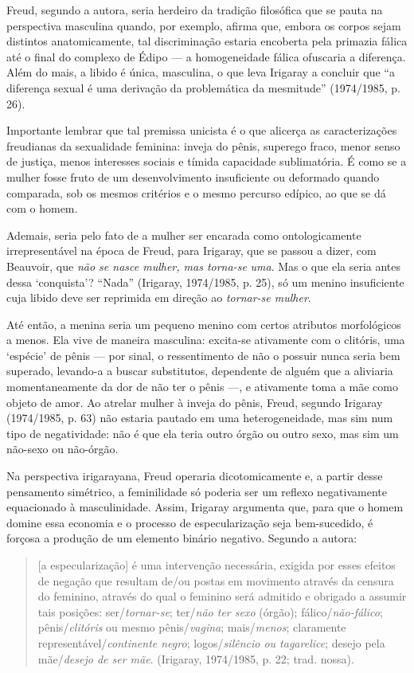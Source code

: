 Freud, segundo a autora, seria herdeiro da tradição filosófica que se
pauta na perspectiva masculina quando, por exemplo, afirma que, embora
os corpos sejam distintos anatomicamente, tal discriminação estaria
encoberta pela primazia fálica até o final do complexo de Édipo --- a
homogeneidade fálica ofuscaria a diferença. Além do mais, a libido é
única, masculina, o que leva Irigaray a concluir que ``a diferença
sexual é uma derivação da problemática da mesmitude'' (1974/1985, p.
26).

Importante lembrar que tal premissa unicista é o que alicerça as
caracterizações freudianas da sexualidade feminina: inveja do pênis,
superego fraco, menor senso de justiça, menos interesses sociais e
tímida capacidade sublimatória. É como se a mulher fosse fruto de um
desenvolvimento insuficiente ou deformado quando comparada, sob os
mesmos critérios e o mesmo percurso edípico, ao que se dá com o homem.

Ademais, seria pelo fato de a mulher ser encarada como ontologicamente
irrepresentável na época de Freud, para Irigaray, que se passou a dizer,
com Beauvoir, que \emph{não se nasce mulher, mas torna-se} \emph{uma}.
Mas o que ela seria antes dessa `conquista'? ``Nada'' (Irigaray,
1974/1985, p. 25), só um menino insuficiente cuja libido deve ser
reprimida em direção ao \emph{tornar-se mulher}.

Até então, a menina seria um pequeno menino com certos atributos
morfológicos a menos. Ela vive de maneira masculina: excita-se
ativamente com o clitóris, uma `espécie' de pênis --- por sinal, o
ressentimento de não o possuir nunca seria bem superado, levando-a a
buscar substitutos, dependente de alguém que a aliviaria momentaneamente
da dor de não ter o pênis ---, e ativamente toma a mãe como objeto de
amor. Ao atrelar mulher à inveja do pênis, Freud, segundo Irigaray
(1974/1985, p. 63) não estaria pautado em uma heterogeneidade, mas sim
num tipo de negatividade: não é que ela teria outro órgão ou outro sexo,
mas sim um não-sexo ou não-órgão.

Na perspectiva irigarayana, Freud operaria dicotomicamente e, a partir
desse pensamento simétrico, a feminilidade só poderia ser um reflexo
negativamente equacionado à masculinidade. Assim, Irigaray argumenta
que, para que o homem domine essa economia e o processo de
especularização seja bem-sucedido, é forçosa a produção de um elemento
binário negativo. Segundo a autora:

\begin{quote}
{[}a especularização{]} é uma intervenção necessária, exigida por esses
efeitos de negação que resultam de/ou postas em movimento através da
censura do feminino, através do qual o feminino será admitido e obrigado
a assumir tais posições: ser/\emph{tornar-se}; ter/\emph{não ter sexo}
(órgão); fálico/\emph{não-fálico}; pênis/\emph{clitóris} ou mesmo
pênis/\emph{vagina}; mais/\emph{menos}; claramente
representável/\emph{continente negro}; logos/\emph{silêncio ou
tagarelice}; desejo pela mãe/\emph{desejo de ser mãe}. (Irigaray,
1974/1985, p. 22; trad. nossa).
\end{quote}

